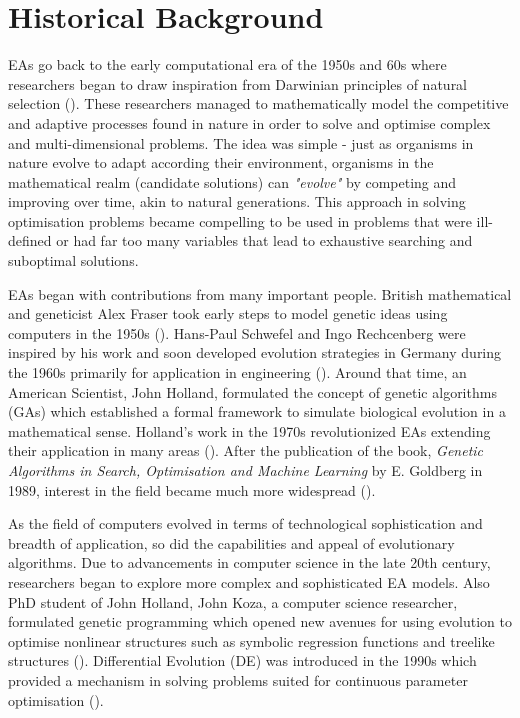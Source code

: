 \section{Historical Background}\label{historical_background}
EAs go back to the early computational era of the 1950s and 60s where researchers began to draw inspiration from Darwinian principles of natural selection (\cite{alainsanaEvolutionaryAlgorithms}). These researchers managed to mathematically model the competitive and adaptive processes found in nature in order to solve and optimise complex and multi-dimensional problems. The idea was simple - just as organisms in nature evolve to adapt according their environment, organisms in the mathematical realm (candidate solutions) can \textit{"evolve"} by competing and improving over time, akin to  natural generations. This approach in solving optimisation problems became compelling to be used in problems that were ill-defined or had far too many variables that lead to exhaustive searching and suboptimal solutions. \bigskip

\noindent EAs began with contributions from many important people. British mathematical and geneticist Alex Fraser took early steps to model genetic ideas using computers in the 1950s (\cite{links2002alex}). Hans-Paul Schwefel and Ingo Rechcenberg were inspired by his work and soon developed evolution strategies in Germany during the 1960s primarily for application in engineering (\cite{alainsanaEvolutionaryAlgorithms}). Around that time, an American Scientist, John Holland, formulated the concept of genetic algorithms (GAs) which established a formal framework to simulate biological evolution in a mathematical sense. Holland's work in the 1970s revolutionized EAs extending their application in many areas (\cite{alainsanaEvolutionaryAlgorithms}). After the publication of the book, \textit{Genetic Algorithms in Search, Optimisation and Machine Learning} by E. Goldberg in 1989, interest in the field became much more widespread (\cite{alainsanaEvolutionaryAlgorithms}).\bigskip

\noindent As the field of computers evolved in terms of technological sophistication and breadth of application, so did the capabilities and appeal of evolutionary algorithms. Due to advancements in computer science in the late 20th century, researchers began to explore more complex and sophisticated EA models. Also PhD student of John Holland, John Koza, a computer science researcher, formulated genetic programming which opened new avenues for using evolution to optimise non\-linear structures such as symbolic regression functions and tree\-like structures (\cite{koza1994genetic}). Differential Evolution (DE) was introduced in the 1990s which provided a mechanism in solving problems suited for continuous parameter optimisation (\cite{das2010differential}).

